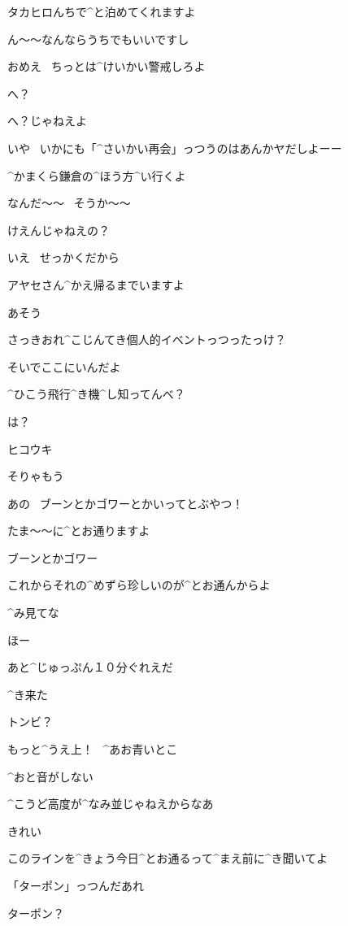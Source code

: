 \page
\Alpha タカヒロんちで^{と}{泊}めてくれますよ

\Alpha ん〜〜なんならうちでもいいですし

\Ayase おめえ
\ ちっとは^{けいかい}{警戒}しろよ

\Alpha へ？

\Ayase へ？じゃねえよ

\Ayase いや
\ いかにも「^{さいかい}{再会}」っつうのはあんかヤだしよーー

\Ayase ^{かまくら}{鎌倉}の^{ほう}{方}^{い}{行}くよ

\Alpha なんだ〜〜
\ そうか〜〜

\page
\Ayase けえんじゃねえの？

\Alpha いえ
\ せっかくだから

\Alpha アヤセさん^{かえ}{帰}るまでいますよ

\Ayase あそう

\Ayase さっきおれ^{こじんてき}{個人的}イベントっつったっけ？

\Ayase そいでここにいんだよ

\page
\Ayase ^{ひこう}{飛行}^{き}{機}^{し}{知}ってんべ？

\Alpha は？

\Alpha ヒコウキ

\Alpha そりゃもう

\Alpha あの
\ ブーンとかゴワーとかいってとぶやつ！

\Alpha たま〜〜に^{とお}{通}りますよ

\Ayase ブーンとかゴワー

\Ayase これからそれの^{めずら}{珍}しいのが^{とお}{通}んからよ

\Ayase ^{み}{見}てな

\Alpha ほー

\Ayase あと^{じゅっぷん}{１０分}ぐれえだ

\page
\Ayase ^{き}{来}た

\Alpha トンビ？

\Ayase もっと^{うえ}{上}！
\ ^{あお}{青}いとこ

\page[76]
\Alpha ^{おと}{音}がしない

\Ayase ^{こうど}{高度}が^{なみ}{並}じゃねえからなあ

\Alpha きれい

\Ayase このラインを^{きょう}{今日}^{とお}{通}るって^{まえ}{前}に^{き}{聞}いてよ

\page
\Ayase 「ターポン」っつんだあれ

\Alpha ターポン？

